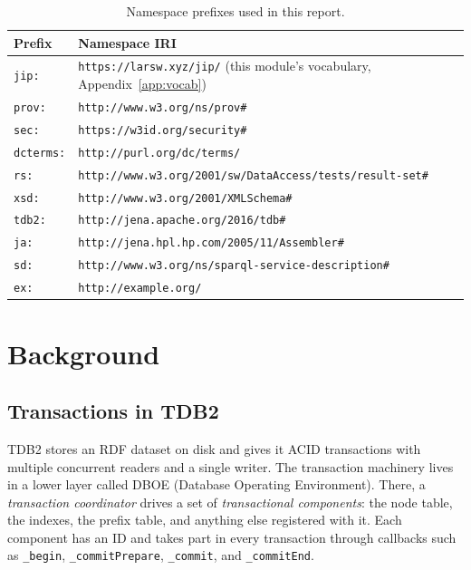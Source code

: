 \documentclass[11pt,a4paper]{article}
\newcommand{\code}[1]{\texttt{#1}}
\begin{document}
\begin{table}[htbp]
\centering
\caption{Namespace prefixes used in this report.}
\label{tab:prefixes}
\small
\begin{tabular}{@{}ll@{}}
\toprule
Prefix & Namespace IRI \\
\midrule
\code{jip:} & \code{https://larsw.xyz/jip/} (this module's vocabulary, Appendix~\ref{app:vocab}) \\
\code{prov:} & \code{http://www.w3.org/ns/prov\#} \\
\code{sec:} & \code{https://w3id.org/security\#} \\
\code{dcterms:} & \code{http://purl.org/dc/terms/} \\
\code{rs:} & \code{http://www.w3.org/2001/sw/DataAccess/tests/result-set\#} \\
\code{xsd:} & \code{http://www.w3.org/2001/XMLSchema\#} \\
\code{tdb2:} & \code{http://jena.apache.org/2016/tdb\#} \\
\code{ja:} & \code{http://jena.hpl.hp.com/2005/11/Assembler\#} \\
\code{sd:} & \code{http://www.w3.org/ns/sparql-service-description\#} \\
\code{ex:} & \code{http://example.org/} \\
\bottomrule
\end{tabular}
\end{table}

\section{Background}
\label{sec:background}

\subsection{Transactions in TDB2}
\label{sec:tdb-txn}

TDB2 stores an RDF dataset on disk and gives it ACID transactions with multiple concurrent
readers and a single writer. The transaction machinery lives in a lower layer called DBOE
(Database Operating Environment). There, a \emph{transaction coordinator} drives a set of \emph{transactional components}: the
node table, the indexes, the prefix table, and anything else registered with it. Each component
has an ID and takes part in every transaction through callbacks such as \code{\_begin},
\code{\_commitPrepare}, \code{\_commit}, and \code{\_commitEnd}.
\end{document}
